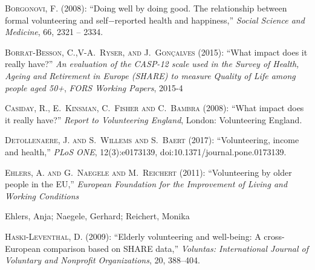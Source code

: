 \documentclass[10pt, letterpaper]{article}
\begin{document}
\begin{spacing}{1.4}
\begin{thebibliography}{87}
\textsc{Borgonovi, F.} (2008): \enquote{Doing well by doing good. The relationship between formal volunteering and self$-$reported health and happiness,} \emph{Social Science and Medicine}, 66,  2321 -- 2334.

\textsc{Borrat-Besson, C.,V-A.~Ryser, and J.~Gonçalves} (2015):  \enquote{What impact does it really have?} \emph{An evaluation of the CASP-12 scale used in the Survey of Health, Ageing and Retirement in Europe (SHARE) to measure Quality of Life among people aged 50+}, \emph{FORS Working Papers}, 2015-4


\textsc{Casiday, R., E.~Kinsman, C.~Fisher and C.~Bambra} (2008):  \enquote{What impact does it really have?} \emph{Report to Volunteering England}, London: Volunteering England.

\textsc{Detollenaere, J. and S.~Willems and S.~Baert} (2017): \enquote{Volunteering, income and health,} \emph{PLoS ONE}, 12(3):e0173139,  doi:10.1371/journal.pone.0173139.

\textsc{Ehlers, A. and G.~Naegele and M.~Reichert} (2011): \enquote{Volunteering by older people in the EU,} \emph{European Foundation for the Improvement of Living and Working Conditions} 

Ehlers, Anja; Naegele, Gerhard; Reichert, Monika

\textsc{Haski-Leventhal, D.} (2009): \enquote{Elderly volunteering and
  well-being: A cross-European comparison based on SHARE data,} \emph{Voluntas:
  International Journal of Voluntary and Nonprofit Organizations}, 20, 388--404.
  
  

\end{thebibliography}
\end{spacing}
\end{document}
